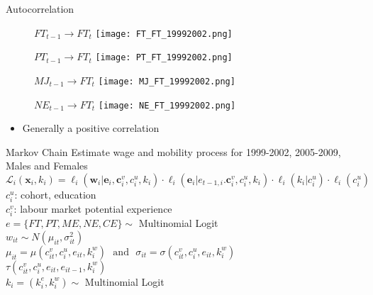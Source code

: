 \documentclass{beamer}
\begin{document}
\begin{frame}{Autocorrelation}\label{ACR}
\begin{figure}[!t]
\centering
\begin{minipage}[b]{0.3\textwidth}{$FT_{t-1}$$\rightarrow$$FT_{t}$}
\centering
\texttt{[image: FT\_FT\_19992002.png]}
\end{minipage}
\begin{minipage}[b]{0.3\textwidth}{$PT_{t-1}$$\rightarrow$$FT_{t}$}
\centering
\texttt{[image: PT\_FT\_19992002.png]}
\end{minipage}
\end{figure}
\begin{figure}[!t]
\centering
\begin{minipage}[b]{0.3\textwidth}{$MJ_{t-1}$$\rightarrow$$FT_{t}$}
\centering
\texttt{[image: MJ\_FT\_19992002.png]}
\end{minipage}
\begin{minipage}[b]{0.3\textwidth}{$NE_{t-1}$$\rightarrow$$FT_{t}$}
\centering
\texttt{[image: NE\_FT\_19992002.png]}
\end{minipage}
\end{figure}
\begin{itemize}
\setlength{\itemsep}{0.7 cm}
\item Generally a positive correlation
\end{itemize}
\end{frame}

\begin{frame}{Markov Chain}
Estimate wage and mobility process for 1999-2002, 2005-2009, Males and Females
\vfill
$
\mathcal{L}_{i}(\textbf{x}_i,k_i)=\ell_{i}(\textbf{w}_i|\textbf{e}_i,\textbf{c}_i^v,c_i^u,k_i) \cdot \ell_{i}(\textbf{e}_i|{e}_{t-1,i}.\textbf{c}_i^v,c_i^u,k_i)\cdot \ell_{i}(k_i|c_i^u)\cdot \ell_{i}(c_i^u)$\\
\vfill
$c_i^u$: cohort, education\\
$c_i^v$: labour market potential experience\\
\vfill
$e=\{FT,PT,ME,NE,CE\}\sim$ Multinomial Logit\\
\vfill
$w_{it} \sim N(\mu_{it},\sigma_{it}^{2})$\\
$\mu_{it} = \mu(c_{it}^{v},c_{i}^{u},e_{it},k_i^w)\,\,\,\, \text{and}\,\,\,\, \sigma_{it} =\sigma(c_{it}^{v},c_{i}^{u},e_{it},k_i^w)$\\
$\tau(c_{it}^{v},c_{i}^{u},e_{it},e_{it-1},k_i^w)$\\
\vfill
$k_i=(k_i^{e},k_i^w)\sim$ Multinomial Logit\\
\end{frame}
\end{document}
